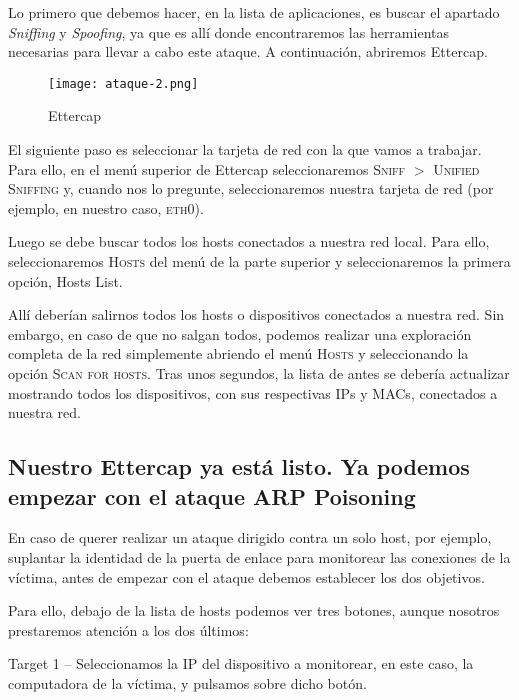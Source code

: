 Lo primero que debemos hacer, en la lista de aplicaciones, es buscar el apartado 
\emph{Sniffing} y \emph{Spoofing}, ya que es allí donde encontraremos las herramientas necesarias
 para llevar a cabo este ataque. A continuación, abriremos Ettercap.

\begin{center}
    \begin{figure}   
       \begin{center}
          \texttt{[image: ataque-2.png]}
       \end{center}
       \caption{Ettercap}
    \end{figure}
 \end{center}

El siguiente paso es seleccionar la tarjeta de red con la que vamos a trabajar. Para 
ello, en el menú superior de Ettercap seleccionaremos \textsc{Sniff} $>$ \textsc{Unified Sniffing} y, 
cuando nos lo pregunte, seleccionaremos nuestra tarjeta de red (por ejemplo, en 
nuestro caso, \textsc{eth0}).

Luego se debe buscar todos los hosts conectados a nuestra red local. Para ello, 
seleccionaremos \textsc{Hosts} del menú de la parte superior y seleccionaremos la primera 
opción, Hosts List.

Allí deberían salirnos todos los hosts o dispositivos conectados a nuestra red. 
Sin embargo, en caso de que no salgan todos, podemos realizar una exploración 
completa de la red simplemente abriendo el menú \textsc{Hosts} y seleccionando la opción 
\textsc{Scan for hosts}. Tras unos segundos, la lista de antes se debería actualizar 
mostrando todos los dispositivos, con sus respectivas IPs y MACs, conectados 
a nuestra red.



\subsection{Nuestro Ettercap ya está listo. Ya podemos empezar con el ataque ARP Poisoning}

En caso de querer realizar un ataque dirigido contra un solo host, por ejemplo, 
suplantar la identidad de la puerta de enlace para monitorear las conexiones 
de la víctima, antes de empezar con el 
ataque debemos establecer los dos objetivos.

Para ello, debajo de la lista de hosts podemos ver tres botones, aunque nosotros 
prestaremos atención a los dos últimos:

    Target 1 – Seleccionamos la IP del dispositivo a monitorear, en este caso, 
    la computadora de la víctima, y pulsamos sobre dicho botón.

